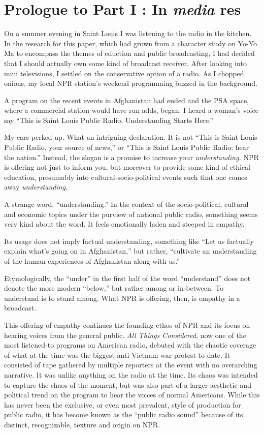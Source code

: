 \documentclass[12pt,letterpaper]{article}
\begin{document}
	\newpage	
	\section*{Prologue to Part I : In \textit{media} res}
	
	\noindent
	On a summer evening in Saint Louis I was listening to the radio in
	the kitchen. In the research for this paper, which had grown from a 
	character
	study on Yo-Yo Ma to encompass the themes of eduction and public 
	broadcasting,
	I had decided that I should actually own some kind of broadcast 
	receiver. 
	After looking into mini televisions, I settled on the conservative 
	option
	of a radio. As I chopped onions, my local NPR station's weekend 
	programming
	buzzed in the background.
	
	A program on the recent events in Afghanistan had ended and the PSA 
	space, where a commercial station
	would have run adds, began. I heard a woman's voice say ``This is Saint
	Louis Public Radio. Understanding Starts Here.'' 

	My ears perked up. What an intriguing declaration. It is not ``This is 
	Saint Louis Public Radio, your source of news,'' or ``This is Saint 
	Louis Public Radio: hear the nation.'' Instead, the 
	slogan is a 
	promise to increase your \textit{understanding. }NPR is offering not
	just to 
	inform you, but moreover to provide some kind of ethical education,
	presumably into cultural-socio-political events such that one comes away
	\textit{understanding.}

	A strange word, ``understanding.'' In the context of the 
	socio-political,
	cultural and economic topics under the purview of national public 
	radio, something seems very kind about the word. It feels emotionally
	laden and steeped in empathy. 

	Its usage does not imply factual understanding, something like ``Let
	us factually explain what's going on in Afghanistan,'' but rather, 
	``cultivate an understanding of the human experiences of Afghanistan 
	along with us.'' 

	Etymologically, the ``under'' in the first half of the word 
	``understand'' does not denote the more modern ``below,'' but rather 
	among or in-between. \autocite{Ety} To understand is to stand among. 
	What NPR is offering, then, is empathy in a broadcast. 

	This offering of empathy continues the founding ethos of NPR 
	and its focus on hearing voices from the general public. 
	\textit{All Things Considered}, now one of the most listened-to programs
	on American radio, debuted with the chaotic coverage of
	what at the time was the biggest anti-Vietnam war protest to date. It
	consisted of tape gathered by multiple reporters at the event with no 
	overarching narrative. It was unlike anything on the radio at the time.
	Its chaos was intended to capture the chaos of the moment, but was also
	part of a larger aesthetic and political trend on the program to hear 
	the voices of normal Americans. While this has never been the exclusive,
	or even most prevalent, style of production for public radio, it has 
	become known as the ``public radio sound'' because of its distinct, 
	recognizable, texture and origin on NPR. 
\end{document}
